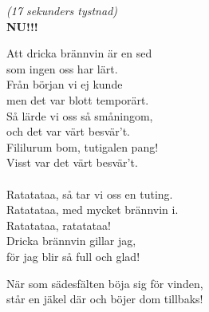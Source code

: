 \documentclass[a6paper, 10pt, twoside]{article}
\begin{document}
\noindent
\begin{center}
\begin{lyrics}
    \textit{\small(17 sekunders tystnad)}\\
    \Large \textbf{NU!!!}
\end{lyrics}
\end{center}
\begin{center}
\end{center}
\begin{lyrics}
Att dricka brännvin är en sed \\
som ingen oss har lärt. \\
Från början vi ej kunde \\
men det var blott temporärt. \\
Så lärde vi oss så småningom, \\
och det var värt besvär't. \\
Fililurum bom, tutigalen pang! \\
Visst var det värt besvär't. \\
\vspace{5pt}\\
Ratatataa, så tar vi oss en tuting. \\
Ratatataa, med mycket brännvin i. \\
Ratatataa, ratatataa! \\
Dricka brännvin gillar jag, \\
för jag blir så full och glad! 
\end{lyrics}
\begin{center}
\end{center}
\begin{lyrics}
När som sädesfälten böja sig för vinden, \\
står en jäkel där och böjer dom tillbaks! 
\end{lyrics}
\end{document}
